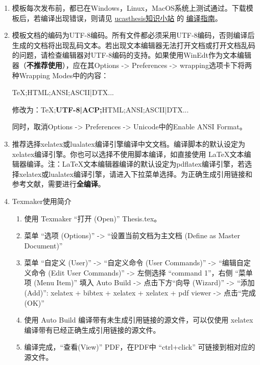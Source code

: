 \begin{enumerate}
    \item 模板每次发布前，都已在Windows，Linux，MacOS系统上测试通过。下载模板后，若编译出现错误，则请见 \href{https://github.com/mohuangrui/ucasthesis/wiki}{ucasthesis知识小站} 的 \href{https://github.com/mohuangrui/ucasthesis/wiki/%E7%BC%96%E8%AF%91%E6%8C%87%E5%8D%97}{编译指南}。

    \item 模板文档的编码为UTF-8编码。所有文件都必须采用UTF-8编码，否则编译后生成的文档将出现乱码文本。若出现文本编辑器无法打开文档或打开文档乱码的问题，请检查编辑器对UTF-8编码的支持。如果使用WinEdt作为文本编辑器（\textbf{不推荐使用}），应在其Options -> Preferences -> wrapping选项卡下将两种Wrapping Modes中的内容：
        
        TeX;HTML;ANSI;ASCII|DTX...
        
        修改为：TeX;\textbf{UTF-8|ACP;}HTML;ANSI;ASCII|DTX...
        
        同时，取消Options -> Preferences -> Unicode中的Enable ANSI Format。

    \item 推荐选择xelatex或lualatex编译引擎编译中文文档。编译脚本的默认设定为xelatex编译引擎。你也可以选择不使用脚本编译，如直接使用 \LaTeX{}文本编辑器编译。注：\LaTeX{}文本编辑器编译的默认设定为pdflatex编译引擎，若选择xelatex或lualatex编译引擎，请进入下拉菜单选择。为正确生成引用链接和参考文献，需要进行\textbf{全编译}。

    \item Texmaker使用简介
        \begin{enumerate}
            \footnotesize
            \item 使用 Texmaker “打开 (Open)” Thesis.tex。
            \item 菜单 “选项 (Options)” -> “设置当前文档为主文档 (Define as Master Document)”
            \item 菜单 “自定义 (User)” -> “自定义命令 (User Commands)” -> “编辑自定义命令 (Edit User Commands)” -> 左侧选择 “command 1”，右侧 “菜单项 (Menu Item)” 填入 Auto Build -> 点击下方“向导 (Wizard)” -> “添加 (Add)”: xelatex + bibtex + xelatex + xelatex + pdf viewer -> 点击“完成 (OK)”
            \item 使用 Auto Build 编译带有未生成引用链接的源文件，可以仅使用 xelatex 编译带有已经正确生成引用链接的源文件。
            \item 编译完成，“查看(View)” PDF，在PDF中 “ctrl+click” 可链接到相对应的源文件。
        \end{enumerate}
    

\end{enumerate}
